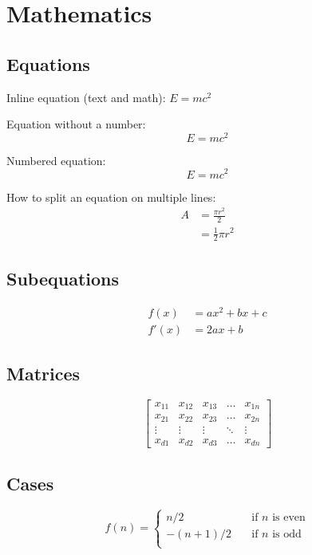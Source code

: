 \chapter{Mathematics}
\section{Equations}\label{sec:mathematics:equations}

Inline equation (text and math): $E=mc^2$

Equation without a number:
$$E = mc^2$$

Numbered equation:
\begin{equation} \label{eq:euler}
	E = mc^2
\end{equation}


How to split an equation on multiple lines:
\begin{equation} \label{eq:split}
	\begin{split}
		A & = \frac{\pi r^2}{2} \\
		& = \frac{1}{2} \pi r^2
	\end{split}
\end{equation}

\section{Subequations}
\begin{subequations}
	\begin{align}
		f(x)  &= a x^2+b x +c\\
		f'(x) &= 2 a x +b
	\end{align}
\end{subequations}

\section{Matrices}\label{sec:mathematics:matrices}
\begin{equation}
	\begin{bmatrix}
		x_{11} & x_{12} & x_{13} & \dots  & x_{1n} \\
		x_{21} & x_{22} & x_{23} & \dots  & x_{2n} \\
		\vdots & \vdots & \vdots & \ddots & \vdots \\
		x_{d1} & x_{d2} & x_{d3} & \dots  & x_{dn}
	\end{bmatrix}
\end{equation}


\section{Cases}
\begin{equation}
	f(n) =
	\begin{cases}
		n/2 & \quad \text{if } n \text{ is even}\\
		-(n+1)/2 & \quad \text{if } n \text{ is odd}\\
	\end{cases}
\end{equation}